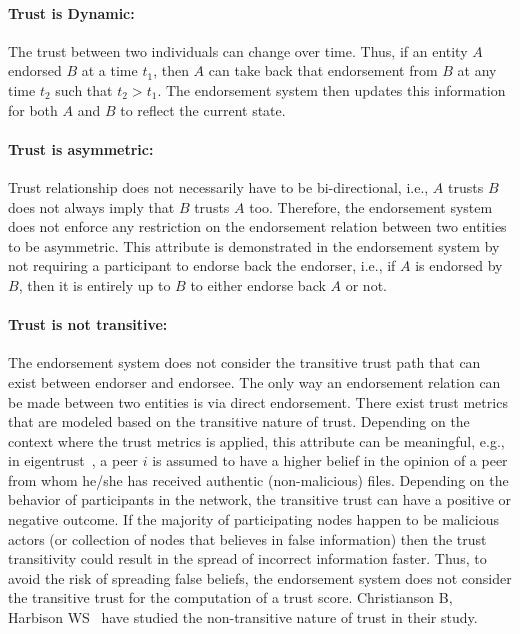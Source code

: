 \paragraph{Trust is Dynamic:}The trust between two individuals can change over
time. Thus, if an entity $A$ endorsed $B$ at a time $t_{1}$, then $A$ can take
back that endorsement from $B$  at any time $t_{2}$ such that $t_{2} > t_{1}$.
The endorsement system then updates this information for both $A$ and $B$ to
reflect the current state.  
\paragraph{Trust is asymmetric:}Trust relationship does not necessarily have
to be bi-directional, i.e., $A$ trusts $B$ does not always imply that $B$
trusts $A$ too. Therefore, the endorsement system does not enforce any
restriction on the endorsement relation between two entities to be asymmetric.
This attribute is demonstrated in the endorsement system by not requiring a
participant to endorse back the endorser, i.e., if $A$ is endorsed by $B$, then
it is entirely up to $B$ to either endorse back $A$ or not.
\paragraph{Trust is not transitive:}The endorsement system does not consider
the transitive trust path that can exist between endorser and endorsee. The
only way an endorsement relation can be made between two entities is via direct
endorsement. There exist trust metrics that are modeled based on the
transitive nature of trust. Depending on the context where the trust metrics is
applied, this attribute can be meaningful, e.g., in
eigentrust~\cite{kamvar2003eigentrust}, a peer $i$ is assumed to have a higher
belief in the opinion of a peer from whom he/she has received authentic
(non-malicious) files. Depending on the behavior of participants in the
network, the transitive trust can have a positive or negative outcome. If the
majority of participating nodes happen to be malicious actors (or collection of
nodes that believes in false information) then the trust transitivity could
result in the spread of incorrect information faster.  Thus, to avoid the risk
of spreading false beliefs, the endorsement system does not consider the
transitive trust for the computation of a trust score.  Christianson B,
Harbison WS~\cite{christianson1996isn} have studied the non-transitive nature
of trust in their study. 
%
